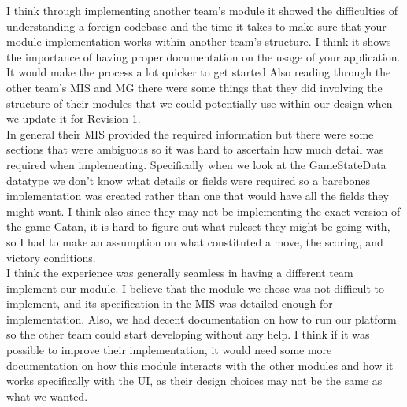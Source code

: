 \documentclass[12pt, titlepage]{article}
\begin{document}
  I think through implementing another team's module it showed the difficulties of understanding a foreign codebase and the time it takes to make sure that your module implementation works within another team's structure. I think it shows the importance of having proper documentation on the usage of your application. It would make the process a lot quicker to get started Also reading through the other team's MIS and MG there were some things that they did involving the structure of their modules that we could potentially use within our design when we update it for Revision 1. \\
  In general their MIS provided the required information but there were some sections that were ambiguous so it was hard to ascertain how much detail was required when implementing. Specifically when we look at the GameStateData datatype we don't know what details or fields were required so a barebones implementation was created rather than one that would have all the fields they might want. I think also since they may not be implementing the exact version of the game Catan, it is hard to figure out what ruleset they might be going with, so I had to make an assumption on what constituted a move, the scoring, and victory conditions. \\
  I think the experience was generally seamless in having a different team implement our module. I believe that the module we chose was not difficult to implement, and its specification in the MIS was detailed enough for implementation. Also, we had decent documentation on how to run our platform so the other team could start developing without any help. I think if it was possible to improve their implementation, it would need some more documentation on how this module interacts with the other modules and how it works specifically with the UI, as their design choices may not be the same as what we wanted.
\end{document}
